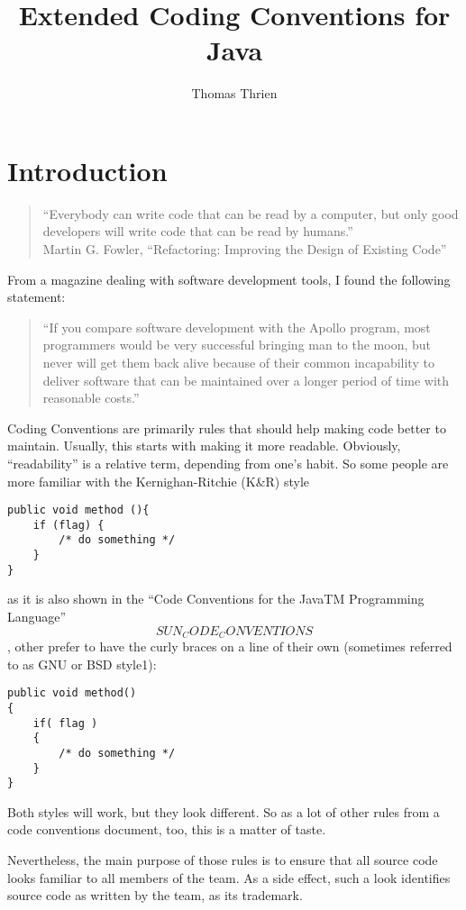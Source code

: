 \documentclass[12pt,a4paper,titlepage,parskip=half]{scrbook}
\author{Thomas Thrien}
\title{Extended Coding Conventions for Java}
\begin{document}
\tableofcontents

\chapter{Introduction}
\begin{quotation}
“Everybody can write code that can be read by a computer,
but only good developers will write code that can be read by humans.”\\
Martin G. Fowler, “Refactoring: Improving the Design of Existing Code”
\end{quotation}

From a magazine dealing with software development tools, I found the following statement:

\begin{quotation}
“If you compare software development with the Apollo program, most programmers would be very successful bringing man to the moon, but never will get them back alive because of their common incapability to deliver software that can be maintained over a longer period of time with reasonable costs.”
\end{quotation}

Coding Conventions are primarily rules that should help making code better to maintain. Usually, this starts with making it more readable. Obviously, “readability” is a relative term, depending from one's habit. So some people are more familiar with the Kernighan-Ritchie (K\&R) style

\begin{lstlisting}
public void method (){
    if (flag) {
        /* do something */
    }
}
\end{lstlisting}

as it is also shown in the “Code Conventions for the JavaTM Programming Language” \[SUN_CODE_CONVENTIONS\], other prefer to have the curly braces on a line of their own (sometimes referred to as GNU or BSD style1):

\begin{lstlisting}
public void method()
{
    if( flag )
    {
        /* do something */
    }
}
\end{lstlisting}

Both styles will work, but they look different. So as a lot of other rules from a code conventions document, too, this is a matter of taste.

Nevertheless, the main purpose of those rules is to ensure that all source code looks familiar to all members of the team. As a side effect, such a look identifies source code as written by the team, as its trademark.
\end{document}

